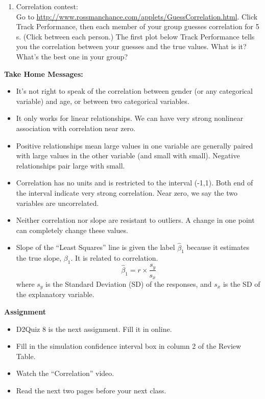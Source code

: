 \begin{enumerate}
\item Correlation contest:\\
  Go to
  \url{http://www.rossmanchance.com/applets/GuessCorrelation.html}.
  Click \fbox{$\surd$} {\sf Track Performance}, then each member of your
  group guesses correlation for 5 s. (Click  between each person.)  The first plot
  below {\sf Track Performance} tells you the correlation between your
  guesses and the true values.  What  is it? What's the best one in
  your group? 
\begin{students} 
\vspace{1cm}
\end{students}



\end{enumerate}

\begin{center}
  {\bf Take Home Messages:}\vspace{-.4cm}
\end{center}
\begin{itemize}
\item It's not right to speak of the correlation between gender (or any
  categorical variable) and age, or between two categorical variables.
\item It only works for linear relationships.  We can have very strong
  nonlinear association with correlation near zero.
\item Positive relationships mean large values in one variable are
  generally  paired  with large values  in  the other variable
  (and small with small).  Negative relationships pair large with small.
\item Correlation has no units and is restricted to the interval
  (-1,1). Both end of the interval indicate very strong
  correlation. Near zero, we say the two variables are uncorrelated.

\item Neither correlation nor slope are resistant to outliers.  A
  change in one point can completely change these values.
\item Slope of the ``Least Squares'' line is given the label
  $\hat{\beta}_1$ because it estimates the true slope, $\beta_1$.  It is
  related to correlation.  
  $$  \hat{\beta}_1 = r \times\frac{s_y}{s_x}$$
  where $s_y$ is the Standard Deviation (SD) of the responses, and $s_x$ is
  the SD of the explanatory variable.
\end{itemize}




\noindent
{\bf Assignment} \vspace{-.2in}
\begin{itemize}
\item D2Quiz 8 is the next assignment.  Fill it in online.
\item Fill in the simulation confidence interval box in column 2 of
  the Review Table.
\item Watch the ``Correlation'' video.
\item Read the next two pages before your next class.
\end{itemize}

